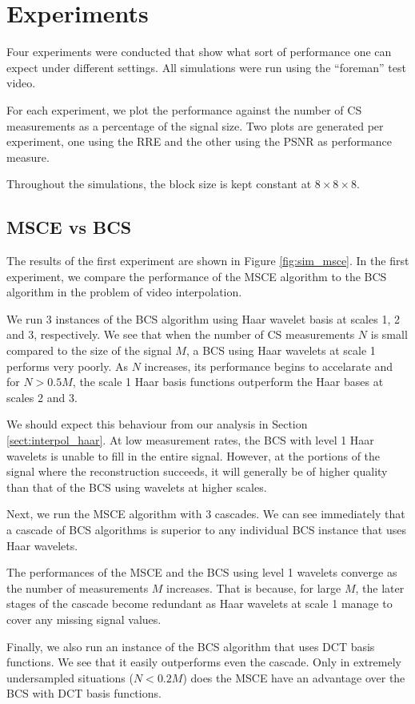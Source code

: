 \section{Experiments}
Four experiments were conducted that show what sort of performance one can expect under different settings.
All simulations were run using the ``foreman'' test video.

For each experiment, we plot the performance against the number of CS measurements as a percentage of the signal size.
Two plots are generated per experiment, one using the RRE and the other using the PSNR as performance measure.

Throughout the simulations, the block size is kept constant at $8\times 8\times 8$.

\subsection{MSCE vs BCS}
The results of the first experiment are shown in Figure \ref{fig:sim_msce}.
In the first experiment, we compare the performance of the MSCE algorithm to the BCS algorithm in the problem of video interpolation.

We run 3 instances of the BCS algorithm using Haar wavelet basis at scales 1, 2 and 3, respectively.
We see that when the number of CS measurements $N$ is small compared to the size of the signal $M$, a BCS using Haar wavelets at scale 1 performs very poorly.
As $N$ increases, its performance begins to accelarate and for $N > 0.5M$, the scale 1 Haar basis functions outperform the Haar bases at scales 2 and 3. 

We should expect this behaviour from our analysis in Section \ref{sect:interpol_haar}.
At low measurement rates, the BCS with level 1 Haar wavelets is unable to fill in the entire signal.
However, at the portions of the signal where the reconstruction succeeds, it will generally be of higher quality than that of the BCS using wavelets at higher scales.

Next, we run the MSCE algorithm with 3 cascades.
We can see immediately that a cascade of BCS algorithms is superior to any individual BCS instance that uses Haar wavelets.

The performances of the MSCE and the BCS using level 1 wavelets converge as the number of measurements $M$ increases.
That is because, for large $M$, the later stages of the cascade become redundant as Haar wavelets at scale 1 manage to cover any missing signal values.

Finally, we also run an instance of the BCS algorithm that uses DCT basis functions.
We see that it easily outperforms even the cascade.
Only in extremely undersampled situations ($N<0.2M$) does the MSCE have an advantage over the BCS with DCT basis functions.


